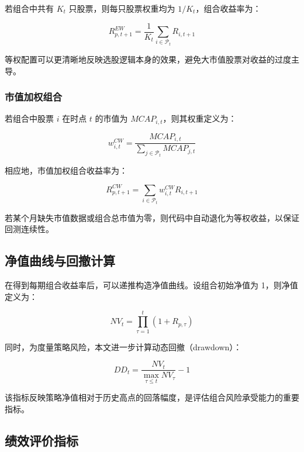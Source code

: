 \documentclass[a4paper,10pt]{article}
\begin{document}
若组合中共有 $K_t$ 只股票，则每只股票权重均为 $1/K_t$，组合收益率为：

\begin{equation}
R_{p,t+1}^{EW} = \frac{1}{K_t} \sum_{i \in \mathcal{P}_t} R_{i,t+1}
\end{equation}

等权配置可以更清晰地反映选股逻辑本身的效果，避免大市值股票对收益的过度主导。

\subsubsection{市值加权组合}

若组合中股票 $i$ 在时点 $t$ 的市值为 $MCAP_{i,t}$，则其权重定义为：

\begin{equation}
w_{i,t}^{CW} = \frac{MCAP_{i,t}}{\sum_{j \in \mathcal{P}_t} MCAP_{j,t}}
\end{equation}

相应地，市值加权组合收益率为：

\begin{equation}
R_{p,t+1}^{CW} = \sum_{i \in \mathcal{P}_t} w_{i,t}^{CW} R_{i,t+1}
\end{equation}

若某个月缺失市值数据或组合总市值为零，则代码中自动退化为等权收益，以保证回测连续性。

\subsection{净值曲线与回撤计算}

在得到每期组合收益率后，可以递推构造净值曲线。设组合初始净值为 1，则净值定义为：

\begin{equation}
NV_t = \prod_{\tau=1}^{t} (1 + R_{p,\tau})
\end{equation}

同时，为度量策略风险，本文进一步计算动态回撤（drawdown）：

\begin{equation}
DD_t = \frac{NV_t}{\max_{\tau \le t} NV_\tau} - 1
\end{equation}

该指标反映策略净值相对于历史高点的回落幅度，是评估组合风险承受能力的重要指标。

\subsection{绩效评价指标}
\end{document}
